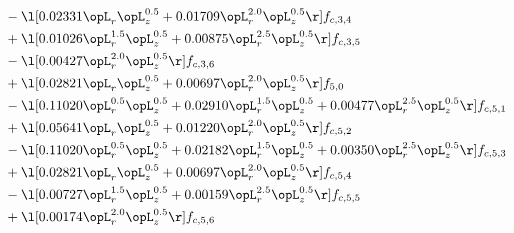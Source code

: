 \begin{alignat}{2}
& - \l[  0.02331 \opL_r \opL_z^{0.5} +  0.01709 \opL_r^{2.0} \opL_z^{0.5}  \r] f_{c,3,4} \nonumber \\ 
& + \l[  0.01026 \opL_r^{1.5} \opL_z^{0.5} +  0.00875 \opL_r^{2.5} \opL_z^{0.5}  \r] f_{c,3,5} \nonumber \\ 
& - \l[  0.00427 \opL_r^{2.0} \opL_z^{0.5}  \r] f_{c,3,6} \nonumber \\ 
& + \l[  0.02821 \opL_r \opL_z^{0.5} +  0.00697 \opL_r^{2.0} \opL_z^{0.5}  \r] f_{5,0} \nonumber \\ 
& - \l[  0.11020 \opL_r^{0.5} \opL_z^{0.5} +  0.02910 \opL_r^{1.5} \opL_z^{0.5} +  0.00477 \opL_r^{2.5} \opL_z^{0.5}  \r] f_{c,5,1} \nonumber \\ 
& + \l[  0.05641 \opL_r \opL_z^{0.5} +  0.01220 \opL_r^{2.0} \opL_z^{0.5}  \r] f_{c,5,2} \nonumber \\ 
& - \l[  0.11020 \opL_r^{0.5} \opL_z^{0.5} +  0.02182 \opL_r^{1.5} \opL_z^{0.5} +  0.00350 \opL_r^{2.5} \opL_z^{0.5}  \r] f_{c,5,3} \nonumber \\ 
& + \l[  0.02821 \opL_r \opL_z^{0.5} +  0.00697 \opL_r^{2.0} \opL_z^{0.5}  \r] f_{c,5,4} \nonumber \\ 
& - \l[  0.00727 \opL_r^{1.5} \opL_z^{0.5} +  0.00159 \opL_r^{2.5} \opL_z^{0.5}  \r] f_{c,5,5} \nonumber \\ 
& + \l[  0.00174 \opL_r^{2.0} \opL_z^{0.5}  \r] f_{c,5,6} \nonumber \\ 
\end{alignat} 


